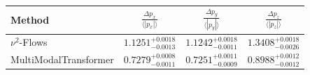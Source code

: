     \begin{tabular}{lccc}
        \toprule
        Method & $\frac{\Delta p_x}{\langle |p_x|\rangle}$ & $\frac{\Delta p_y}{\langle |p_y|\rangle}$ & $\frac{\Delta p_z}{\langle |p_z|\rangle}$ \\
        \midrule
        $\nu^2$-Flows & $1.1251^{+0.0018}_{-0.0013}$ & $1.1242^{+0.0018}_{-0.0011}$ & $1.3408^{+0.0018}_{-0.0026}$ \\
        MultiModalTransformer & $0.7279^{+0.0008}_{-0.0011}$ & $0.7251^{+0.0011}_{-0.0009}$ & $0.8988^{+0.0012}_{-0.0012}$ \\
        \bottomrule
    \end{tabular}